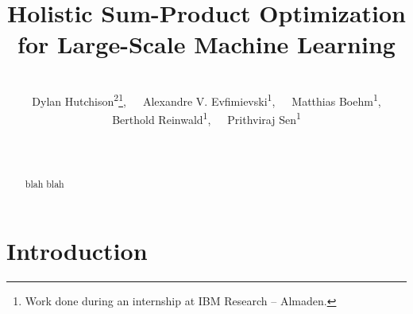 \documentclass{vldb}
\begin{document}
\title{Holistic Sum-Product Optimization\\for Large-Scale Machine Learning}

\author{
  \alignauthor 
	~\vspace{-0.7cm}\\
	Dylan Hutchison\textsuperscript{2}\thanks{Work done during an internship at IBM Research -- Almaden.},~~~Alexandre V. Evfimievski\textsuperscript{1},~~~Matthias Boehm\textsuperscript{1},\vspace{0.1cm}\\
  Berthold Reinwald\textsuperscript{1},~~~Prithviraj Sen\textsuperscript{1}\\~\\
  \\
}

\maketitle

\begin{abstract}
blah blah
\end{abstract}

\section{Introduction}
\end{document}
